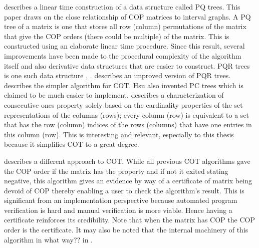 \documentclass[MS,]{iitmdiss}
\begin{document}
\cite{bl76} describes a linear time construction of a data structure
called PQ trees. This paper draws on the close relationship of COP
matrices to interval graphs. A PQ tree of a matrix is one that stores
all row (column) permutations of the matrix that give the COP orders
(there could be multiple) of the matrix. This is constructed using an
elaborate linear time procedure. Since this
result, several improvements have been made to the procedural
complexity of the algorithm itself and also derivative data structures
that are easier to construct. PQR trees is one such data structure
\cite{mm96}, \cite{mpt98}.  \cite{tm05} describes an improved version of PQR
trees. \cite{wlh02} describes
the simpler algorithm for COT.  Hsu also invented PC trees \cite{wlh01} which is
claimed to be much easier to implement. \cite{nsnrs09} describes a
characterization of consecutive ones property solely based on the
cardinality properties of the set representations of the columns
(rows); every column (row) is equivalent to a set that has the row
(column) indices of the rows (columns) that have one entries in this
column (row). This is interesting and relevant, especially to this
thesis because it simplifies COT to a great degree. 

\cite{mcc04} describes a different approach to COT. While all previous
COT algorithms gave the COP order if the matrix has the property and
if not it exited stating negative, this algorithm gives an evidence by
way of a certificate of
matrix being devoid of COP thereby enabling a user to check the
algorithm's result. This is significant from an implementation
perspective because automated program verification is hard and manual
verification is more viable. Hence having a certificate
reinforces its credibility. Note that when the matrix has COP the COP
order is the certificate.  It may also be noted that the internal
machinery of this algorithm  {in what way??} in \cite{co98}.

\end{document}
